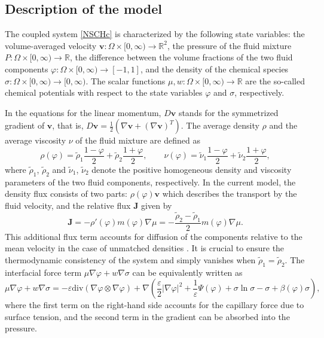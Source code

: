 \documentclass[11pt,reqno]{amsart}
\def\J{\mathbf{J}}
\newcommand{\R}{\ensuremath{\mathbb{R}}}
\def\vv{\bm{v}}
\begin{document}
\subsection{Description of the model }
The coupled system \eqref{NSCHc} is characterized by the following state variables: the volume-averaged velocity $\vv\colon \Omega\times [0,\infty)\to \R^2$, the pressure of the fluid mixture $P\colon \Omega \times [0,\infty)\to \R$, the difference between the volume fractions of the two fluid components $\varphi\colon \Omega \times [0,\infty)\to [-1,1]$, and the density of the chemical species $\sigma\colon \Omega \times [0,\infty)\to [0,\infty)$. The scalar functions $\mu, w: \Omega \times [0,\infty)\to \mathbb{R}$ are the so-called chemical potentials with respect to the state variables $\varphi$ and $\sigma$, respectively.

In the equations for the linear momentum, $D \vv$ stands for the symmetrized gradient of $\vv$, that is, $D \vv=\frac12 (\nabla \vv +(\nabla \vv)^T)$. The average density $\rho$ and the average viscosity $\nu$ of the fluid mixture are defined as
%
\begin{equation}
\label{meanr-v}
\rho(\varphi)= \widetilde{\rho}_1 \frac{1-\varphi}{2}+ \widetilde{\rho}_2 \frac{1+\varphi}{2},
\qquad
\nu(\varphi)=\widetilde{\nu}_1 \frac{1-\varphi}{2}+ \widetilde{\nu}_2 \frac{1+\varphi}{2},
\end{equation}
%
where $\widetilde{\rho}_1$, $\widetilde{\rho}_2$ and $\widetilde{\nu}_1$, $\widetilde{\nu}_2$ denote the positive homogeneous density and viscosity parameters of the two fluid components, respectively.
In the current model, the density flux consists of two parts: $\rho(\varphi)\bm{v}$ which describes the transport by the fluid velocity, and the relative flux $\J$ given by
%
\begin{equation}
\label{Jrhonu}
\J= -\rho'(\varphi) m(\varphi) \nabla \mu= -\frac{\widetilde{\rho}_2-\widetilde{\rho}_1}{2} m(\varphi) \nabla \mu.
\end{equation}
%
This additional flux term accounts for diffusion of the components relative to the mean velocity in the case of unmatched densities \cite{AGG2012}. It is crucial to ensure the thermodynamic consistency of the system and simply vanishes when $\widetilde{\rho}_1=\widetilde{\rho}_2$. The interfacial force term $\mu \nabla \varphi + w \nabla \sigma$ can be equivalently written as
$$
\mu \nabla \varphi + w \nabla \sigma = -\varepsilon \mathrm{div} (\nabla \varphi \otimes \nabla \varphi) + \nabla \left(\frac{\varepsilon}{2}|\nabla \varphi|^2+ \frac{1}{\varepsilon}\Psi(\varphi)+ \sigma \ln \sigma -\sigma +\beta(\varphi) \sigma \right) \! ,
$$
where the first term on the right-hand side accounts for the capillary force due to surface tension, and the second term in the gradient can be absorbed into the pressure.
\end{document}
